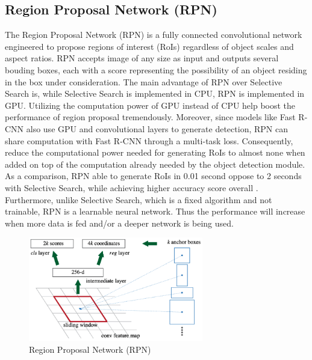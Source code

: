 \subsection{Region Proposal Network (RPN)}  \label{subsec:rpn}
The Region Proposal Network (RPN) is a fully connected convolutional network engineered to propose regions of interest (RoIs) regardless of object scales and aspect ratios. RPN accepts image of any size as input and outputs several bouding boxes, each with a score representing the possibility of an object residing in the box under consideration. The main advantage of RPN over Selective Search is, while Selective Search is implemented in CPU, RPN is implemented in GPU. Utilizing the computation power of GPU instead of CPU help boost the performance of region proposal tremendously. Moreover, since models like Fast R-CNN also use GPU and convolutional layers to generate detection, RPN can share computation with Fast R-CNN through a multi-task loss. Consequently, reduce the computational power needed for generating RoIs to almost none when added on top of the computation already needed by the object detection module. As a comparison, RPN able to generate RoIs in 0.01 second oppose to 2 seconds with Selective Search, while achieving higher accuracy score overall \cite{faster_rcnn_2015}. Furthermore, unlike Selective Search, which is a fixed algorithm and not trainable, RPN is a learnable neural network. Thus the performance will increase when more data is fed and/or a deeper network is being used. 

\begin{figure}[!ht]
    \centering
    \includegraphics[width=3in]{figures/rpn_anchor.png}
    \caption{Region Proposal Network (RPN) \cite{faster_rcnn_2015}} \label{fig:faster_rcnn_anchor}
\end{figure}

